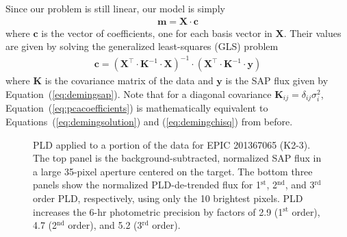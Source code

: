 \documentclass[]{emulateapj}
\begin{document}
Since our problem is still linear, our model is simply
\begin{align}
\label{eq:pcamodel}
\mathbf{m} = \mathbf{X} \cdot \mathbf{c}
\end{align}
where $\mathbf{c}$ is the vector of coefficients, one for each basis vector in $\mathbf{X}$.
Their values are given by solving the generalized least-squares (GLS) problem
\begin{align}
\label{eq:pcacoefficients}
\mathbf{c} = \left(\mathbf{X}^\top \cdot \mathbf{K}^{-1} \cdot \mathbf{X}\right)^{-1} \cdot \left(\mathbf{X}^\top \cdot \mathbf{K}^{-1} \cdot \mathbf{y}\right)
\end{align}
where $\mathbf{K}$ is the covariance matrix of the data and $\mathbf{y}$ is the
SAP flux given by Equation~(\ref{eq:demingsap}). Note that for a diagonal covariance
$\mathbf{K}_{ij} = \delta_{ij}\sigma_i^2$, Equation~(\ref{eq:pcacoefficients}) is
mathematically equivalent to Equations~(\ref{eq:demingsolution}) and 
(\ref{eq:demingchisq}) from before.

\begin{figure}[h]
  \begin{center}
       \caption{PLD applied to a portion of the data for EPIC 201367065 (K2-3). 
       The top panel is the background-subtracted, normalized SAP flux in a large 
       35-pixel aperture centered on the target. The bottom three panels show 
       the normalized PLD-de-trended flux for 1$^{\mathrm{st}}$, 2$^{\mathrm{nd}}$, and 
       3$^{\mathrm{rd}}$ order PLD, respectively, using only the 10 brightest pixels. 
       PLD increases the 6-hr photometric precision by factors of 2.9 (1$^{\mathrm{st}}$ order), 4.7 
       (2$^{\mathrm{nd}}$ order), and 5.2 (3$^{\mathrm{rd}}$ order).}
     \label{fig:third_order}
  \end{center}
\end{figure}
\end{document}

